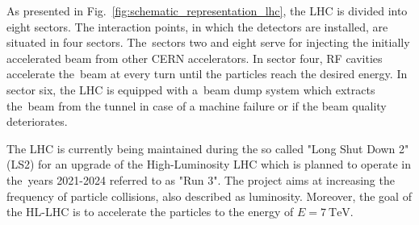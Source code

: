 As presented in Fig.~\ref{fig:schematic_representation_lhc}, the LHC is divided into eight sectors. The interaction points, in which the detectors are installed, are situated in four sectors. The~sectors two and eight serve for injecting the initially accelerated beam from other CERN accelerators. In sector four, RF cavities accelerate the~beam at every turn until the particles reach the desired energy. In sector six, the LHC is equipped with a~beam dump system which extracts the~beam from the tunnel in case of a machine failure or if the beam quality deteriorates.~\cite[p.~1-4]{maciejewski_cosimulation_transient_effects_in_magnets}

The LHC is currently being maintained during the so called "Long Shut Down 2" (LS2) for an upgrade of the High-Luminosity LHC which is planned to operate in the~years 2021-2024 referred to as "Run 3". The project aims at increasing the frequency of particle collisions, also described as luminosity. Moreover, the goal of the HL-LHC is to accelerate the particles to the energy of $E=7~\text{TeV}$.~\cite{cern_main_webpage, hl_lhc__main_webpage}